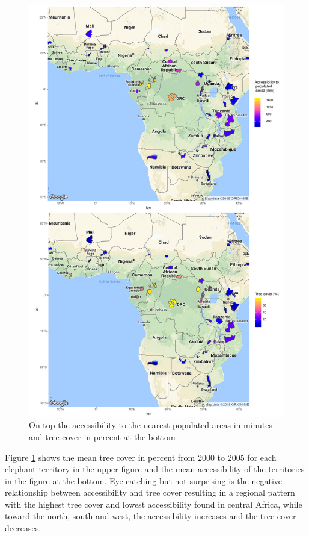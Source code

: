\begin{center}
	\begin{figure}[H]
		\begin{center}
			\includegraphics[width=14cm]{images/sample_session_1-cropped.pdf}
			\caption{On top the accessibility to the nearest populated areas in minutes and tree cover in percent at the bottom}
			\label{sample_session_1}
		\end{center}
	\end{figure}
\end{center}


Figure \ref{sample_session_1} shows the mean tree cover in percent from 2000 to 2005 for each elephant territory in the upper figure and the mean accessibility of the territories in the figure at the bottom. Eye-catching but not surprising is the negative relationship between accessibility and tree cover resulting in a regional pattern with the highest tree cover and lowest accessibility found in central Africa, while toward the north, south and west, the accessibility increases and the tree cover decreases.

